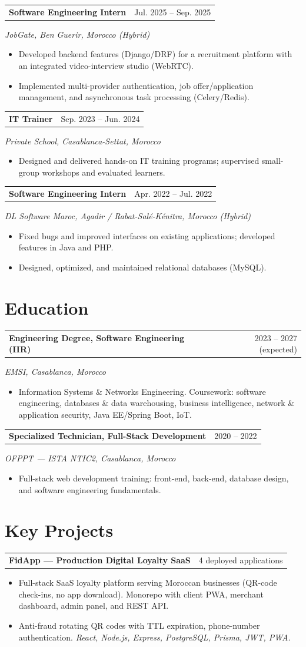 \documentclass[11pt,a4paper]{article}
\makeatletter
\newcommand{\entry}[2]{%
  \noindent
  \begin{tabularx}{\textwidth}{@{}X r@{}}
    \textbf{#1} & {\small #2} \\
  \end{tabularx}\par\vspace{1pt}
}
\newcommand{\subentry}[1]{{\small\color{subtext}\itshape #1}\par\vspace{2pt}}
\newcommand{\items}[1]{%
  \begin{itemize}[leftmargin=14pt, itemsep=1.5pt, topsep=2pt, parsep=0pt]
    #1
  \end{itemize}
}
\makeatother
\begin{document}
\entry{Software Engineering Intern}{Jul. 2025 -- Sep. 2025}
\subentry{JobGate, Ben Guerir, Morocco (Hybrid)}
\items{
  \item Developed backend features (Django/DRF) for a recruitment platform with an integrated video-interview studio (WebRTC).
  \item Implemented multi-provider authentication, job offer/application management, and asynchronous task processing (Celery/Redis).
}

\entry{IT Trainer}{Sep. 2023 -- Jun. 2024}
\subentry{Private School, Casablanca-Settat, Morocco}
\items{
  \item Designed and delivered hands-on IT training programs; supervised small-group workshops and evaluated learners.
}

\entry{Software Engineering Intern}{Apr. 2022 -- Jul. 2022}
\subentry{DL Software Maroc, Agadir / Rabat-Salé-Kénitra, Morocco (Hybrid)}
\items{
  \item Fixed bugs and improved interfaces on existing applications; developed features in Java and PHP.
  \item Designed, optimized, and maintained relational databases (MySQL).
}

\section{Education}

\entry{Engineering Degree, Software Engineering (IIR)}{2023 -- 2027 (expected)}
\subentry{EMSI, Casablanca, Morocco}
\items{
  \item Information Systems \& Networks Engineering. Coursework: software engineering, databases \& data warehousing, business intelligence, network \& application security, Java EE/Spring Boot, IoT.
}

\entry{Specialized Technician, Full-Stack Development}{2020 -- 2022}
\subentry{OFPPT — ISTA NTIC2, Casablanca, Morocco}
\items{
  \item Full-stack web development training: front-end, back-end, database design, and software engineering fundamentals.
}

\section{Key Projects}

\entry{FidApp --- Production Digital Loyalty SaaS}{4 deployed applications}
\items{
  \item Full-stack SaaS loyalty platform serving Moroccan businesses (QR-code check-ins, no app download). Monorepo with client PWA, merchant dashboard, admin panel, and REST API.
  \item Anti-fraud rotating QR codes with TTL expiration, phone-number authentication. \textit{React, Node.js, Express, PostgreSQL, Prisma, JWT, PWA.}
}
\end{document}
